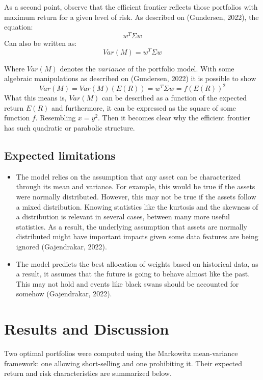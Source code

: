 \documentclass[12pt]{article}
\begin{document}
As a second point, observe that the efficient frontier reflects those portfolios with maximum return for a given level of risk. As described on (Gundersen, 2022), the equation:
\begin{equation}
    w^T \Sigma w
\end{equation}
Can also be written as:
\begin{equation}
    Var(M) = w^T \Sigma w 
\end{equation}

Where $Var(M)$ denotes the $variance$ of the portfolio model. With some algebraic manipulations as described on (Gundersen, 2022) it is possible to show
\begin{equation}
    Var(M) = Var(M) (E(R)) = w^T \Sigma w = f(E(R))^2 
\end{equation}
What this means is, $Var(M)$ can be described as a function of the expected return $E(R)$ and furthermore, it can be expressed as the square of some function $f$. Resembling $x=y^2$. Then it becomes clear why the efficient frontier has such quadratic or parabolic structure.

\subsection*{Expected limitations}
\begin{itemize}
    \item The model relies on the assumption that any asset can be characterized through its mean and variance. For example, this would be true if the assets were normally distributed. However, this may not be true if the assets follow a mixed distribution. Knowing statistics like the kurtosis and the skewness of a distribution is relevant in several cases, between many more useful statistics. As a result, the underlying assumption that assets are normally distributed might have important impacts given some data features are being ignored (Gajendrakar, 2022).
    
    \item The model predicts the best allocation of weights based on historical data, as a result, it assumes that the future is going to behave almost like the past. This may not hold and events like black swans should be accounted for somehow (Gajendrakar, 2022).
    
\end{itemize}




\section{Results and Discussion}
Two optimal portfolios were computed using the Markowitz mean-variance framework: one allowing short-selling and one prohibiting it. Their expected return and risk characteristics are summarized below.
\end{document}
